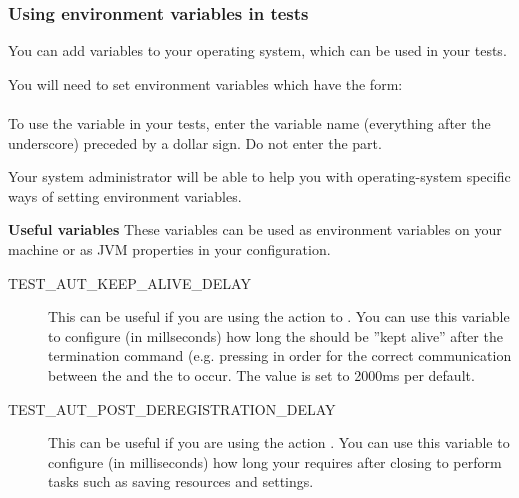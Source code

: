 \subsubsection{Using environment variables in tests}
\label{TasksSystemVariables}


You can add variables to your operating system, which can be used in your tests. 

You will need to set environment variables which have the form:\\

\\


To use the variable in your tests, enter the variable name (everything after the underscore) preceded by a dollar sign. Do not enter the  part.


Your system administrator will be able to help you with operating-system specific ways of setting environment variables. 

\textbf{Useful variables}
These variables can be used as environment variables on your machine or as JVM properties in your \gdaut{} configuration. 

\begin{description}
\item [TEST\_AUT\_KEEP\_ALIVE\_DELAY]{This can be useful if you are using the action to . You can use this variable to configure (in millseconds) how long the \gdaut{} should be ''kept alive'' after the termination command (e.g. pressing  in order for the correct communication between the \ite{} and the \gdaut{} to occur. The value is set to 2000ms per default. }
\item [TEST\_AUT\_POST\_DEREGISTRATION\_DELAY]{This can be useful if you are using the action . You can use this variable to configure (in milliseconds) how long your \gdaut{} requires after closing to perform tasks such as saving resources and settings. }
\end{description}



